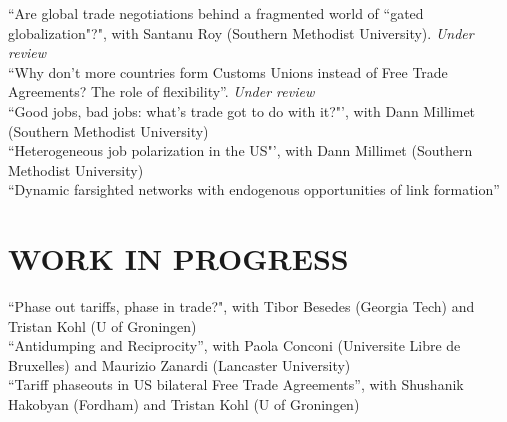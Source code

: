 \documentclass[11pt]{res}
\begin{document}
\begin{resume}
\phantom{.}\vspace{.05cm}
{``Are global trade negotiations behind a fragmented world of ``gated globalization"?"}, with Santanu Roy (Southern Methodist University). \emph{Under review}\vspace{1.5mm}\\
{``Why don't more countries form Customs Unions instead of Free Trade Agreements? The role of flexibility''}.\emph{ Under review} \vspace{1.5mm}\\
{``Good jobs, bad jobs: what's trade got to do with it?"'}, with Dann Millimet (Southern Methodist University)\vspace{1.5mm}\\
{``Heterogeneous job polarization in the US"'}, with Dann Millimet (Southern Methodist University)\vspace{1.5mm}\\
{ ``Dynamic farsighted networks with endogenous opportunities of link formation''} \vspace{1.5mm}\\

\section{WORK IN PROGRESS}\vspace{1.5mm}
``Phase out tariffs, phase in trade?", with Tibor Besedes (Georgia Tech) and Tristan Kohl (U of Groningen) \vspace{1.5mm}\\
``Antidumping and Reciprocity'', with Paola Conconi (Universite Libre de Bruxelles) and Maurizio Zanardi (Lancaster University)\\
``Tariff phaseouts in US bilateral Free Trade Agreements'', with Shushanik Hakobyan (Fordham) and Tristan Kohl (U of Groningen)\\


\end{resume}
\end{document}
